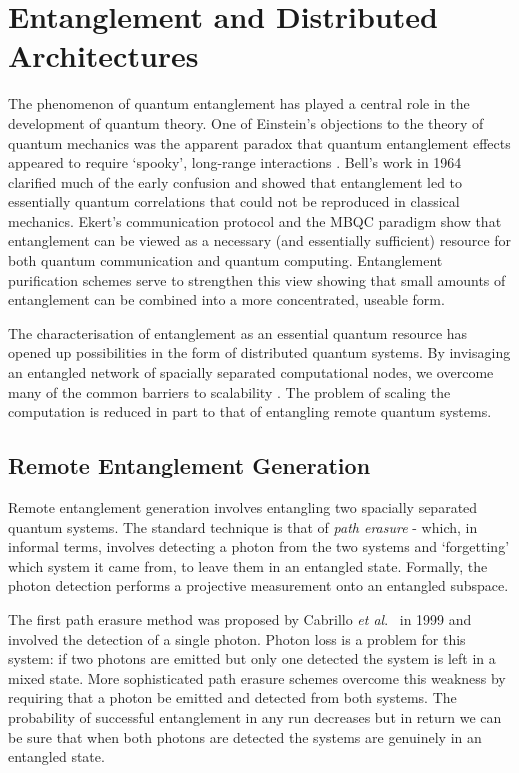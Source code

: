 \section{Entanglement and Distributed Architectures}

The phenomenon of quantum entanglement has played a central role in the development of quantum theory. One of Einstein's objections to the theory of quantum mechanics was the apparent paradox that quantum entanglement effects appeared to require `spooky', long-range interactions \cite{epr}. Bell's work in 1964 \cite{bells_theorem} clarified much of the early confusion and showed that entanglement led to essentially quantum correlations that could not be reproduced in classical mechanics. Ekert's communication protocol \cite{ekert_91} and the MBQC paradigm \cite{one_way_qc} show that entanglement can be viewed as a necessary (and essentially sufficient) resource for both quantum communication and quantum computing. Entanglement purification schemes \cite{purification} serve to strengthen this view showing that small amounts of entanglement can be combined into a more concentrated, useable form.

The characterisation of entanglement as an essential quantum resource has opened up possibilities in the form of distributed quantum systems. By invisaging an entangled network of spacially separated computational nodes, we overcome many of the common barriers to scalability \cite{distributed_qip_review_08}. The problem of scaling the computation is reduced in part to that of entangling remote quantum systems.

\subsection{Remote Entanglement Generation}\label{remote_entanglement_generation}

Remote entanglement generation involves entangling two spacially separated quantum systems. The standard technique is that of \textit{path erasure} - which, in informal terms, involves detecting a photon from the two systems and `forgetting' which system it came from, to leave them in an entangled state. Formally, the photon detection performs a projective measurement onto an entangled subspace.

The first path erasure method was proposed by Cabrillo \textit{et al}.\ \cite{basic_path_erasure} in 1999 and involved the detection of a single photon. Photon loss is a problem for this system: if two photons are emitted but only one detected the system is left in a mixed state. More sophisticated path erasure schemes \cite{double_hearald_1, double_hearald_2, barrett+kok, double_hearald_3} overcome this weakness by requiring that a photon be emitted and detected from both systems. The probability of successful entanglement in any run decreases but in return we can be sure that when both photons are detected the systems are genuinely in an entangled state. 

